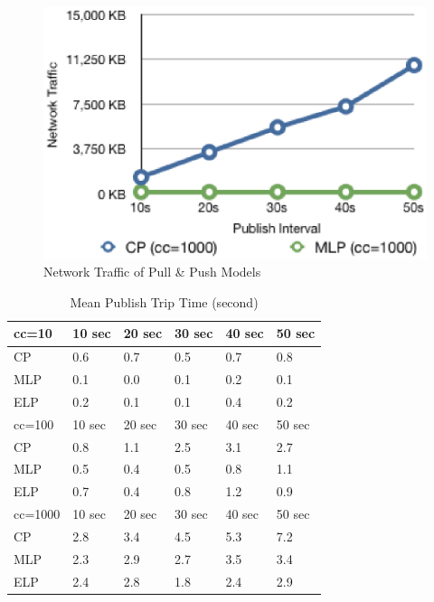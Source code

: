 \begin{figure}[htb!]
\centering%
    \includegraphics[scale=0.60]{figures/io.eps}
    \caption{Network Traffic of Pull \& Push Models}
    \label{fig:traffic}
\end{figure}


\begin{table}
\centering \caption{\label{tb:mpt_all} Mean Publish Trip Time (second)}
\begin{tabular}{|l|l|l|l|l|l|}
    \hline cc=10 & 10 sec & 20 sec & 30 sec & 40 sec & 50 sec \\
    \hline CP & 0.6 & 0.7 & 0.5 & 0.7 & 0.8 \\
    \hline MLP & 0.1 & 0.0 & 0.1 & 0.2 & 0.1 \\
    \hline ELP & 0.2 & 0.1 & 0.1 & 0.4 & 0.2 \\
    \hline
    \hline cc=100 & 10 sec & 20 sec & 30 sec & 40 sec & 50 sec \\
    \hline CP & 0.8 & 1.1 & 2.5 & 3.1 & 2.7 \\
    \hline MLP & 0.5 & 0.4 & 0.5 & 0.8 & 1.1 \\
    \hline ELP & 0.7 & 0.4 & 0.8 & 1.2 & 0.9 \\
    \hline
    \hline cc=1000& 10 sec & 20 sec & 30 sec & 40 sec & 50 sec \\
    \hline CP & 2.8 & 3.4 & 4.5 & 5.3 & 7.2 \\
    \hline MLP & 2.3 & 2.9 & 2.7 & 3.5 & 3.4 \\
    \hline ELP & 2.4 & 2.8 & 1.8 & 2.4 & 2.9 \\
    \hline
\end{tabular}
\end{table}

